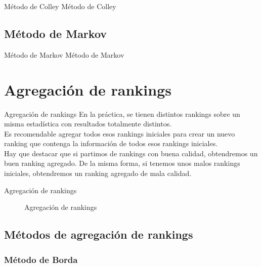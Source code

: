 \documentclass[11pt]{beamer}
\begin{document}
	\begin{frame}{Método de Colley}
		Método de Colley
	\end{frame}
	
	\subsection{Método de Markov}
	
	\begin{frame}{Método de Markov}
		Método de Markov
	\end{frame}
	
	\section{Agregación de rankings}
	
	\begin{frame}{Agregación de rankings}
		En la práctica, se tienen distintos rankings sobre un misma estadística con resultados totalmente distintos.\\
		
		Es recomendable agregar todos esos rankings iniciales para crear un nuevo ranking que contenga la información de todos esos rankings iniciales.\\
		
		Hay que destacar que si partimos de rankings con buena calidad, obtendremos un buen ranking agregado. De la misma forma, si tenemos unos malos rankings iniciales, obtendremos un ranking agregado de mala calidad.
	\end{frame}
	
	\begin{frame}{Agregación de rankings}
		\begin{figure}
			\centering
			\agregacionrankings
			\caption{Agregación de rankings}
			\label{fig:agregación_rankings}
		\end{figure}
	\end{frame}
	
	\subsection{Métodos de agregación de rankings}
	
	\subsubsection{Método de Borda}
	
\end{document}
